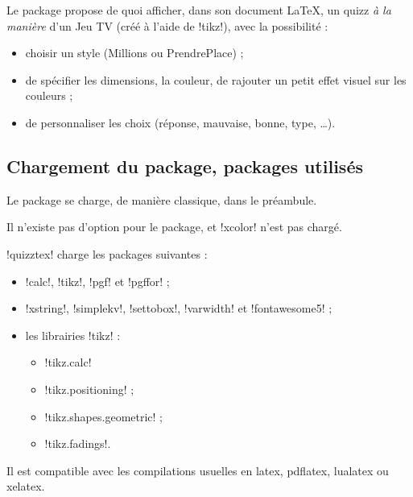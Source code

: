 \documentclass[french,a4paper,11pt]{article}
\begin{document}
\begin{noteblock}
Le package propose de quoi afficher, dans son document \LaTeX, un quizz \textit{à la manière} d'un Jeu TV (créé à l'aide de \packagetex!tikz!), avec la possibilité :

\begin{itemize}
	\item choisir un style (\textsf{Millions} ou \textsf{PrendrePlace}) ;
	\item de spécifier les dimensions, la couleur, de rajouter un petit effet visuel sur les couleurs ;
	\item de personnaliser les choix (réponse, mauvaise, bonne, type, \ldots).
\end{itemize}
\vspace*{-\baselineskip}\leavevmode
\end{noteblock}

\subsection{Chargement du package, packages utilisés}

\begin{importantblock}
Le package se charge, de manière classique, dans le préambule.

Il n'existe pas d'option pour le package, et \packagetex!xcolor! n'est pas chargé.
\end{importantblock}


\begin{noteblock}
\packagetex!quizztex! charge les packages suivantes :

\begin{itemize}
	\item \packagetex!calc!, \packagetex!tikz!, \packagetex!pgf! et \packagetex!pgffor! ;
	\item \packagetex!xstring!, \packagetex!simplekv!, \packagetex!settobox!, \packagetex!varwidth! et \packagetex!fontawesome5! ;
	\item les librairies \packagetex!tikz! :
	\begin{itemize}
		\item \packagetex!tikz.calc!
		\item \packagetex!tikz.positioning! ;
		\item \packagetex!tikz.shapes.geometric! ;
		\item \packagetex!tikz.fadings!.
	\end{itemize}
\end{itemize}

Il est compatible avec les compilations usuelles en \textsf{latex}, \textsf{pdflatex}, \textsf{lualatex} ou \textsf{xelatex}.
\end{noteblock}
\end{document}
